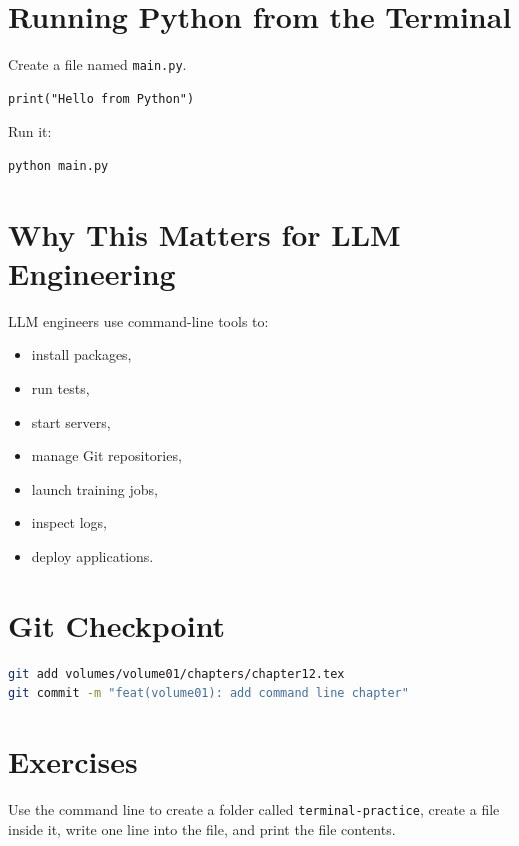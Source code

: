 \section{Running Python from the Terminal}

Create a file named \texttt{main.py}.

\begin{lstlisting}
print("Hello from Python")
\end{lstlisting}

Run it:

\begin{lstlisting}[language=bash]
python main.py
\end{lstlisting}

\section{Why This Matters for LLM Engineering}

LLM engineers use command-line tools to:

\begin{itemize}
    \item install packages,
    \item run tests,
    \item start servers,
    \item manage Git repositories,
    \item launch training jobs,
    \item inspect logs,
    \item deploy applications.
\end{itemize}

\section{Git Checkpoint}

\begin{lstlisting}[language=bash]
git add volumes/volume01/chapters/chapter12.tex
git commit -m "feat(volume01): add command line chapter"
\end{lstlisting}

\section{Exercises}

\begin{exercise}
Use the command line to create a folder called \texttt{terminal-practice}, create a file inside it, write one line into the file, and print the file contents.
\end{exercise}

